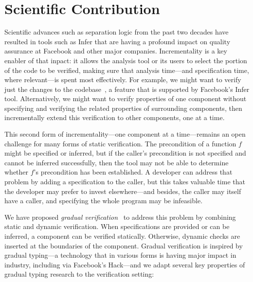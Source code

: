 \documentclass[10pt,twocolumn]{article}
\begin{document}
\begin{sloppypar}


\section{Scientific Contribution}

Scientific advances such as separation logic from the past two decades have resulted in tools such as Infer that are having a profound impact on quality assurance at Facebook and other major companies.  Incrementality is a key enabler of that inpact: it allows the analysis tool or its users to select the portion of the code to be verified, making sure that analysis time---and specification time, where relevant---is spent most effectively.  For example, we might want to verify just the changes to the codebase~\cite{FromStartupsToScaleups}, a feature that is supported by Facebook's Infer tool.  Alternatively, we might want to verify properties of one component without specifying and verifying the related properties of surrounding components, then incrementally extend this verification to other components, one at a time.

This second form of incrementality---one component at a time---remains an open challenge for many forms of static verification.  The precondition of a function $f$ might be specified or inferred, but if the caller's precondition is not specified and cannot be inferred successfully, then the tool may not be able to determine whether $f$'s precondition has been established.  A developer can address that problem by adding a specification to the caller, but this takes valuable time that the developer may prefer to invest elsewhere---and besides, the caller may itself have a caller, and specifying the whole program may be infeasible.

We have proposed \textit{gradual verification}~\cite{GV} to address this problem by combining static and dynamic verification.  When specifications are provided or can be inferred, a component can be verified statically.  Otherwise, dynamic checks are inserted at the boundaries of the component.  Gradual verification is inspired by gradual typing---a technology that in various forms is having major impact in industry, including via Facebook's Hack---and we adapt several key properties of gradual typing research to the verification setting:


\end{sloppypar}
\end{document}
